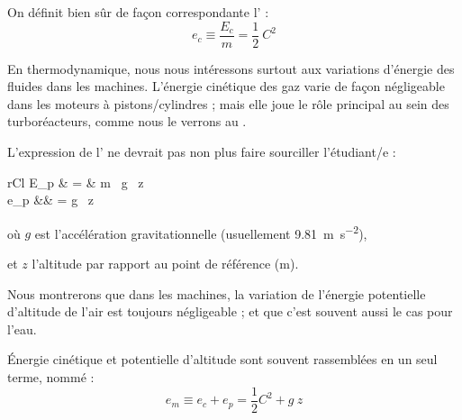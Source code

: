 	On définit bien sûr de façon correspondante l’ :
	\begin{equation}
		e_{c} \equiv \frac{E_{c}}{m} = \frac{1}{2} \ C^2
		\label{def_énergie_cinétique_spécifique}
	\end{equation}


	En thermodynamique, nous nous intéressons surtout aux variations d’énergie des fluides dans les machines. L’énergie cinétique des gaz varie de façon négligeable dans les moteurs à pistons/cylindres ; mais elle joue le rôle principal au sein des turboréacteurs, comme nous le verrons au \coursdix.

	L’expression de l’ ne devrait pas non plus faire sourciller l’étudiant/e :
	\begin{IEEEeqnarray}{rCl}
		E_p 	& = & m \ g \ z	\\
		e_p 	&\equiv&   = g \ z
		\label{eq_énergie_potentielle}
	\end{IEEEeqnarray}
	\begin{equationterms}		
		\item où \tab $g$ \tab est l’accélération gravitationnelle (usuellement \SI{9,81}{\metre\per\second\squared}),
		\item et \tab $z$ \tab l’altitude par rapport au point de référence (\si{\metre}).
	\end{equationterms}

	Nous montrerons que dans les machines, la variation de l’énergie potentielle d’altitude de l’air est toujours négligeable ; et que c’est souvent aussi le cas pour l’eau.

	Énergie cinétique et potentielle d’altitude sont souvent rassemblées en un seul terme, nommé  :
	\begin{equation}
		e_{m} \equiv e_{c} + e_p = \frac{1}{2}C^2 + g \ z
		\label{def_énergie_mécanique_spécifique}
	\end{equation}

